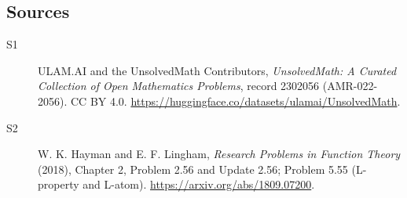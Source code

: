 \documentclass[11pt]{article}
\begin{document}
\subsection{Sources}
\begin{description}
\item[\hypertarget{source:2302056:1}{S1}] ULAM.AI and the UnsolvedMath Contributors, \emph{UnsolvedMath: A Curated Collection of Open Mathematics Problems}, record 2302056 (AMR-022-2056). CC BY 4.0. \url{https://huggingface.co/datasets/ulamai/UnsolvedMath}.
\item[\hypertarget{source:2302056:2}{S2}] W. K. Hayman and E. F. Lingham, \emph{Research Problems in Function Theory} (2018), Chapter 2, Problem 2.56 and Update 2.56; Problem 5.55 (L-property and L-atom). \url{https://arxiv.org/abs/1809.07200}.
\end{description}
\label{end:2302056}
\end{document}
